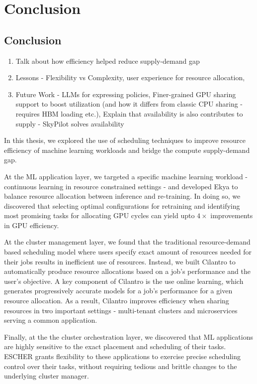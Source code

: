 \chapter{Conclusion}
\label{ch_conclusion}

\section{Conclusion}

\begin{enumerate}
    \item Talk about how efficiency helped reduce supply-demand gap
    \item Lessons - Flexibility vs Complexity, user experience for resource allocation, 
    \item Future Work - LLMs for expressing policies, Finer-grained GPU sharing support to boost utilization (and how it differs from classic CPU sharing - requires HBM loading etc.), Explain that availability is also contributes to supply - SkyPilot solves availability
\end{enumerate}

In this thesis, we explored the use of scheduling techniques to improve resource efficiency of machine learning workloads and bridge the compute supply-demand gap.

At the ML application layer, we targeted a specific machine learning workload - continuous learning in resource constrained settings - and developed Ekya to balance resource allocation between inference and re-training. In doing so, we discovered that selecting optimal configurations for retraining and identifying most promising tasks for allocating GPU cycles can yield upto $4\times$ improvements in GPU efficiency.

At the cluster management layer, we found that the traditional resource-demand based scheduling model where users specify exact amount of resources needed for their jobs results in inefficient use of resources. Instead, we built Cilantro to automatically produce resource allocations based on a job's performance and the user's objective. A key component of Cilantro is the use online learning, which generates progressively accurate models for a job's performance for a given resource allocation. As a result, Cilantro improves efficiency when sharing resources in two important settings - multi-tenant clusters and microservices serving a common application. 

Finally, at the the cluster orchestration layer, we discovered that ML applications are highly sensitive to the exact placement and scheduling of their tasks. ESCHER grants flexibility to these applications to exercise precise scheduling control over their tasks, without requiring tedious and brittle changes to the underlying cluster manager.

